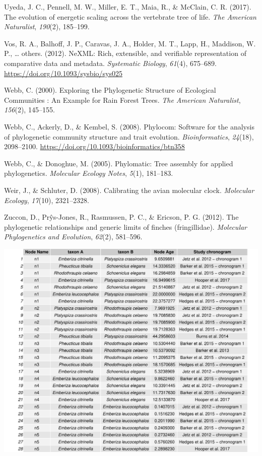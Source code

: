 \documentclass[english,man]{apa6}
\begin{document}
\leavevmode\hypertarget{ref-uyeda2017evolution}{}%
Uyeda, J. C., Pennell, M. W., Miller, E. T., Maia, R., \& McClain, C. R. (2017). The evolution of energetic scaling across the vertebrate tree of life. \emph{The American Naturalist}, \emph{190}(2), 185--199.

\leavevmode\hypertarget{ref-vos2012nexml}{}%
Vos, R. A., Balhoff, J. P., Caravas, J. A., Holder, M. T., Lapp, H., Maddison, W. P., \ldots{} others. (2012). NeXML: Rich, extensible, and verifiable representation of comparative data and metadata. \emph{Systematic Biology}, \emph{61}(4), 675--689. \url{https://doi.org/10.1093/sysbio/sys025}

\leavevmode\hypertarget{ref-Webb2000}{}%
Webb, C. (2000). Exploring the Phylogenetic Structure of Ecological Communities : An Example for Rain Forest Trees. \emph{The American Naturalist}, \emph{156}(2), 145--155.

\leavevmode\hypertarget{ref-Webb2008}{}%
Webb, C., Ackerly, D., \& Kembel, S. (2008). Phylocom: Software for the analysis of phylogenetic community structure and trait evolution. \emph{Bioinformatics}, \emph{24}(18), 2098--2100. \url{https://doi.org/10.1093/bioinformatics/btn358}

\leavevmode\hypertarget{ref-webb2005phylomatic}{}%
Webb, C., \& Donoghue, M. (2005). Phylomatic: Tree assembly for applied phylogenetics. \emph{Molecular Ecology Notes}, \emph{5}(1), 181--183.

\leavevmode\hypertarget{ref-weir2008calibrating}{}%
Weir, J., \& Schluter, D. (2008). Calibrating the avian molecular clock. \emph{Molecular Ecology}, \emph{17}(10), 2321--2328.

\leavevmode\hypertarget{ref-zuccon2012phylogenetic}{}%
Zuccon, D., Prŷs-Jones, R., Rasmussen, P. C., \& Ericson, P. G. (2012). The phylogenetic relationships and generic limits of finches (fringillidae). \emph{Molecular Phylogenetics and Evolution}, \emph{62}(2), 581--596.

\endgroup

\newpage

\label{tbl:table1}
\includegraphics[width=\linewidth]{../tables/table-fringillidae-small-example.pdf}
\end{document}
